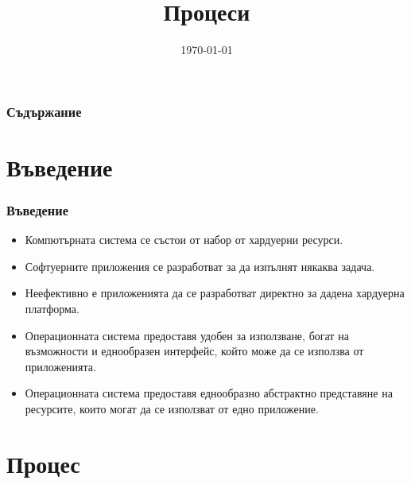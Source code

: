 \documentclass[ignorenonframetext, hyperref=unicode]{beamer}
\title{Процеси}
\date{\today}
\begin{document}
\frame{\maketitle}

\begin{frame}
\frametitle{Съдържание}
\tableofcontents %
\end{frame}

\section{Въведение}


\begin{frame}\frametitle{Въведение}
\begin{itemize}
\item Компютърната система се състои от набор от хардуерни ресурси.
\item Софтуерните приложения се разработват за да изпълнят някаква задача.
\item Неефективно е приложенията да се разработват директно за дадена хардуерна
платформа.
\item Операционната система предоставя удобен за използване, богат на
възможности и еднообразен интерфейс, който може да се използва от приложенията.
\item Операционната система предоставя еднообразно абстрактно представяне на
ресурсите, които могат да се използват от едно приложение.
\end{itemize}
\end{frame}

\section{Процес}
\end{document}
